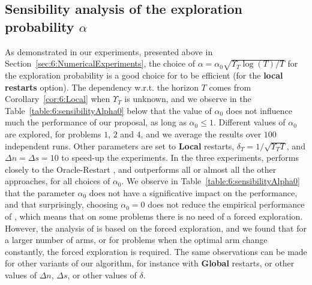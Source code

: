 \subsection{Sensibility analysis of the exploration probability $\alpha$}\label{sec:6:choosingAlpha0}

As demonstrated in our experiments,
presented above in Section~\ref{sec:6:NumericalExperiments},
the choice of $\alpha=\alpha_0\sqrt{\Upsilon_T\log(T)/T}$ for the exploration probability is a good choice for \GLRklUCB{} to be efficient (for the \textbf{local restarts} option).
The dependency w.r.t. the horizon $T$ comes from Corollary~\ref{cor:6:Local} when $\Upsilon_T$ is unknown, and we observe in the Table~\ref{table:6:sensibilityAlpha0} below that the value of $\alpha_0$ does not influence much the performance of our proposal, as long as $\alpha_0\leq1$.
Different values of $\alpha_0$ are explored, for problems $1$, $2$ and $4$, and we average the results over $100$ independent runs.
Other parameters are set to \textbf{Local} restarts, $\delta_T=1/\sqrt{\Upsilon_T T}$, and $\Delta n = \Delta s = 10$ to speed-up the experiments.
%
In the three experiments, \GLRklUCB{} performs closely to the Oracle-Restart \klUCB{}, and outperforms all or almost all the other approaches, for all choices of $\alpha_0$.
We observe in Table~\ref{table:6:sensibilityAlpha0} that the parameter $\alpha_0$ does not have a significative impact on the performance,
and that surprisingly, choosing $\alpha_0 = 0$ does not reduce the empirical performance of \GLRklUCB, which means that on some problems there is no need of a forced exploration.
However, the analysis of \GLRklUCB{} is based on the forced exploration, and we found that for a larger number of arms, or for problems when the optimal arm change constantly, the forced exploration is required.
%
The same observations can be made for other variants of our algorithm, for instance with \textbf{Global} restarts, or other values of $\Delta n$, $\Delta s$, or other values of $\delta$.

